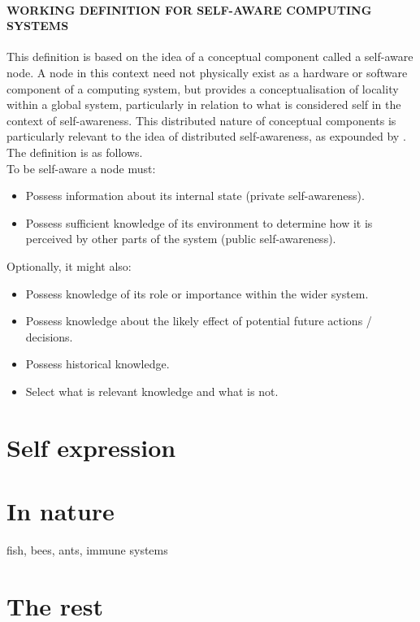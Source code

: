 \documentclass{article}
\begin{document}
		\paragraph{WORKING DEFINITION FOR SELF-AWARE COMPUTING SYSTEMS}
		This definition is based on the idea of a conceptual component called a self-aware node. A node in this context need
		not physically exist as a hardware or software component
		of a computing system, but provides a conceptualisation of
		locality within a global system, particularly in relation to
		what is considered self in the context of self-awareness.
		This distributed nature of conceptual components is particularly relevant to the idea of distributed self-awareness, as
		expounded by \citet{mitchell-2005-self-awareness-and-control-in-decentralized-systems}. The definition is as follows.
		\\
		To be self-aware a node must:
		\begin{itemize}
			\item Possess information about its internal state
			(private self-awareness).
			\item Possess sufficient knowledge of its environment to determine how it is perceived by other
			parts of the system (public self-awareness).
		\end{itemize}
		Optionally, it might also:
		\begin{itemize}
			\item Possess knowledge of its role or importance
			within the wider system.
			\item Possess knowledge about the likely effect of
			potential future actions / decisions.
			\item Possess historical knowledge.
			\item Select what is relevant knowledge and what is
			not.
		\end{itemize}
	\section{Self expression}
	\citet{lewis-2011-a-survey-of-self-awareness-and-its-application-in-computing-systems}
	\section{In nature}
	 fish, bees, ants, immune systems	
	\section{The rest}
	\cite{kernbach-2011-awareness-and-self-awareness-for-multi-robot-organisms}
	\cite{selvaggio-2017-towards-a-self-collision-aware-teleoperation-framework-for-compound-robots}
	\cite{celentano-2016-multi-robot-systems-machine-machine-and-human-machine-interaction-and-their-modelling}
\end{document}

